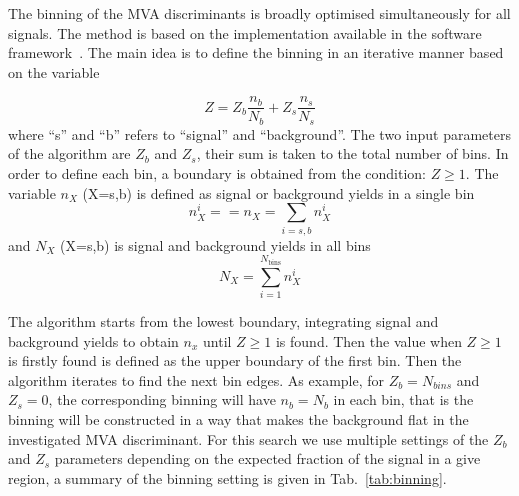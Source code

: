 %
The binning of the MVA discriminants is broadly optimised simultaneously for all signals.  
The method is based on the implementation available in the software framework~\cite{TRexFitterTwiki}.  
The main idea is to define the binning in an iterative manner based on the variable

\begin{equation}
Z=Z_{b}\frac{n_{b}}{N_{b}}+Z_{s}\frac{n_{s}}{N_{s}}
\end{equation}
where ``s'' and ``b'' refers to ``signal'' and ``background''.
The two input parameters of the algorithm are $Z_{b}$ and $Z_{s}$, their sum is taken to the total number of bins. In order to define each bin, 
a boundary is obtained from the condition: $Z\geq 1$. The variable $n_{X}$ (X=s,b) is defined as signal or background yields in a single bin
\begin{equation}
n_{X}^{i}==n_{X}=\sum_{i=s,b}n_{X}^{i}
\end{equation}
and $N_{X}$ (X=s,b) is signal and background yields in all bins
\begin{equation}
N_{X}=\sum_{i=1}^{N_{\mathrm{bins}}}n_{X}^{i}
\end{equation}

The algorithm starts from the lowest boundary, integrating signal and background yields to obtain $n_x$ until $Z\geq 1$ is found. 
Then the value when $Z\geq 1$ is firstly found is defined as the upper boundary of the first bin. Then the algorithm iterates to find the next bin edges.
As example, for $Z_{b}=N_{bins}$ and $Z_{s}=0$, the corresponding binning will have $n_{b}=N_{b}$ in each bin, that is the binning will be 
constructed in a way that makes the background flat in the investigated MVA discriminant. 
For this search we use multiple settings of the $Z_{b}$ and $Z_{s}$ parameters depending on the expected fraction of the signal in a give region, a summary 
of the binning setting is given in Tab.~\ref{tab:binning}.  


